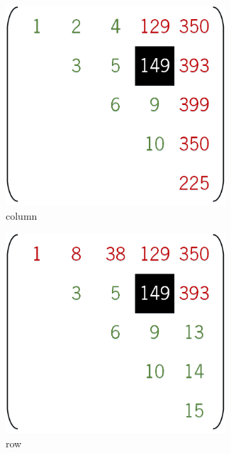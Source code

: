 \documentclass[../thesis]{subfiles}
\begin{document}
	\begin{figure}[htp]
		\begin{subfigure}{0.3\textwidth}
			\centering
			\includegraphics[width=0.9\textwidth]{assets/images/case/column.png}
			\caption{column}
		\end{subfigure}
		\hfill
		\begin{subfigure}{0.3\textwidth}
			\centering
			\includegraphics[width=0.9\textwidth]{assets/images/case/row.png}
			\caption{row}
		\end{subfigure}
		\hfill
		\begin{subfigure}{0.3\textwidth}

\end{subfigure}
\end{figure}
\end{document}
